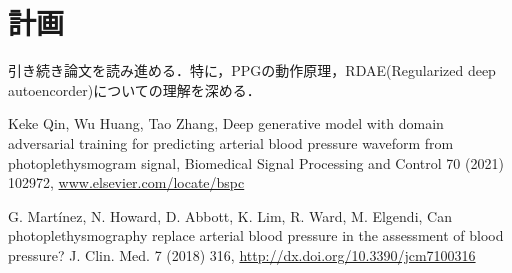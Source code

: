 \documentclass[dvipdfmx]{jsarticle}
\begin{document}
\section{計画}
引き続き論文を読み進める．特に，PPGの動作原理，RDAE(Regularized deep autoencorder)についての理解を深める．
\begin{thebibliography}{}
 Keke Qin, Wu Huang, Tao Zhang, Deep generative model with domain adversarial training for predicting arterial blood pressure waveform from photoplethysmogram signal, Biomedical Signal Processing and Control 70 (2021) 102972, \url{www.elsevier.com/locate/bspc}
\item G. Martínez, N. Howard, D. Abbott, K. Lim, R. Ward, M. Elgendi, Can photoplethysmography
replace arterial blood pressure in the assessment of blood
pressure? J. Clin. Med. 7 (2018) 316, \url{http://dx.doi.org/10.3390/jcm7100316}
\end{thebibliography}
\end{document}
